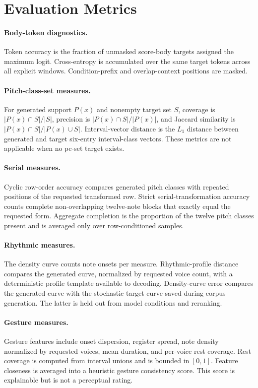 \section{Evaluation Metrics}
\label{sec:metrics}

\paragraph{Body-token diagnostics.}
Token accuracy is the fraction of unmasked score-body targets assigned the maximum logit. Cross-entropy is accumulated over the same target tokens across all explicit windows. Condition-prefix and overlap-context positions are masked.

\paragraph{Pitch-class-set measures.}
For generated support $P(x)$ and nonempty target set $S$, coverage is $|P(x)\cap S|/|S|$, precision is $|P(x)\cap S|/|P(x)|$, and Jaccard similarity is $|P(x)\cap S|/|P(x)\cup S|$. Interval-vector distance is the $L_1$ distance between generated and target six-entry interval-class vectors. These metrics are not applicable when no pc-set target exists.

\paragraph{Serial measures.}
Cyclic row-order accuracy compares generated pitch classes with repeated positions of the requested transformed row. Strict serial-transformation accuracy counts complete non-overlapping twelve-note blocks that exactly equal the requested form. Aggregate completion is the proportion of the twelve pitch classes present and is averaged only over row-conditioned samples.

\paragraph{Rhythmic measures.}
The density curve counts note onsets per measure. Rhythmic-profile distance compares the generated curve, normalized by requested voice count, with a deterministic profile template available to decoding. Density-curve error compares the generated curve with the stochastic target curve saved during corpus generation. The latter is held out from model conditions and reranking.

\paragraph{Gesture measures.}
Gesture features include onset dispersion, register spread, note density normalized by requested voices, mean duration, and per-voice rest coverage. Rest coverage is computed from interval unions and is bounded in $[0,1]$. Feature closeness is averaged into a heuristic gesture consistency score. This score is explainable but is not a perceptual rating.

